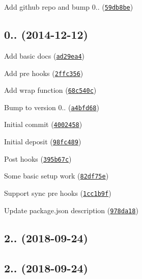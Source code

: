 \begin{DoxyItemize}
\item Add github repo and bump 0.. (\href{https://github.com/vkarpov15/kareem/commit/59db8be}{\tt 59db8be})
\end{DoxyItemize}

\label{_0.0.1}%
 \subsection*{
\footnotesize 0.. (2014-\/12-\/12)
\normalsize }


\begin{DoxyItemize}
\item Add basic docs (\href{https://github.com/vkarpov15/kareem/commit/ad29ea4}{\tt ad29ea4})
\item Add pre hooks (\href{https://github.com/vkarpov15/kareem/commit/2ffc356}{\tt 2ffc356})
\item Add wrap function (\href{https://github.com/vkarpov15/kareem/commit/68c540c}{\tt 68c540c})
\item Bump to version 0.. (\href{https://github.com/vkarpov15/kareem/commit/a4bfd68}{\tt a4bfd68})
\item Initial commit (\href{https://github.com/vkarpov15/kareem/commit/4002458}{\tt 4002458})
\item Initial deposit (\href{https://github.com/vkarpov15/kareem/commit/98fc489}{\tt 98fc489})
\item Post hooks (\href{https://github.com/vkarpov15/kareem/commit/395b67c}{\tt 395b67c})
\item Some basic setup work (\href{https://github.com/vkarpov15/kareem/commit/82df75e}{\tt 82df75e})
\item Support sync pre hooks (\href{https://github.com/vkarpov15/kareem/commit/1cc1b9f}{\tt 1cc1b9f})
\item Update package.\+json description (\href{https://github.com/vkarpov15/kareem/commit/978da18}{\tt 978da18})
\end{DoxyItemize}

\label{_2.2.5}%
 \subsection*{
\footnotesize 2.. (2018-\/09-\/24)
\normalsize }

\label{_2.2.4}%
 \subsection*{
\footnotesize 2.. (2018-\/09-\/24)
\normalsize }

